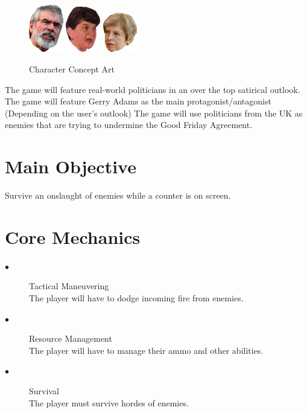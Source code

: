 \documentclass[a4paper]{scrreprt}
\begin{document}
\begin{figure}[H]
\begin{addmargin}[13.5em]{0em}
\includegraphics[width=1.5cm]{gerry-right}
\includegraphics[width=1.5cm]{arlene}
\includegraphics[width=1.5cm]{tess}
\end{addmargin}
\caption{\label{fig:art} Character Concept Art}
\end{figure}

The game will feature real-world politicians in an over the top satirical outlook.
The game will feature Gerry Adams as the main protagonist/antagonist (Depending on the user's outlook)
The game will use politicians from the UK as enemies that are trying to undermine the Good Friday Agreement.

\section{Main Objective}

Survive an onslaught of enemies while a counter is on screen.

\section{Core Mechanics}

\begin{description}
\item[$\bullet$] Tactical Maneuvering \\
The player will have to dodge incoming fire from enemies.
\item[$\bullet$] Resource Management \\
The player will have to manage their ammo and other abilities.
\item[$\bullet$] Survival \\
The player must survive hordes of enemies.
\end{description}
\end{document}

